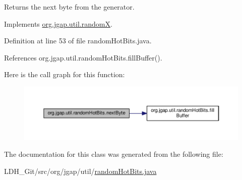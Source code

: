 \begin{DoxyReturn}{Returns}
the next byte from the generator. 
\end{DoxyReturn}


Implements \hyperlink{classorg_1_1jgap_1_1util_1_1random_x_a3ef715392cb00b38bba43e5abc5ab845}{org.\-jgap.\-util.\-random\-X}.



Definition at line 53 of file random\-Hot\-Bits.\-java.



References org.\-jgap.\-util.\-random\-Hot\-Bits.\-fill\-Buffer().



Here is the call graph for this function\-:
\nopagebreak
\begin{figure}[H]
\begin{center}
\leavevmode
\includegraphics[width=350pt]{classorg_1_1jgap_1_1util_1_1random_hot_bits_a4a58860751f086577a9b0f2866a9e647_cgraph}
\end{center}
\end{figure}




The documentation for this class was generated from the following file\-:\begin{DoxyCompactItemize}
\item 
L\-D\-H\-\_\-\-Git/src/org/jgap/util/\hyperlink{random_hot_bits_8java}{random\-Hot\-Bits.\-java}\end{DoxyCompactItemize}
